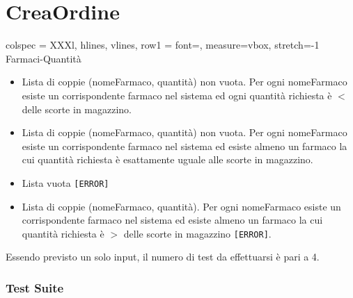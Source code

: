 \section{CreaOrdine}

\begin{table}[!hbp]
	\centering
	\footnotesize
	\begin{tblr}{
		colspec = XXXl,
		hlines, vlines,
		row{1} = {font=\bfseries},
		measure=vbox, stretch=-1
		}
		Farmaci-Quantità \\
		\begin{itemize}[leftmargin=*]
			\item Lista di coppie (nomeFarmaco, quantità) non vuota. Per ogni nomeFarmaco esiste un corrispondente farmaco nel sistema ed ogni quantità richiesta è $<$ delle scorte in magazzino.
			\item Lista di coppie (nomeFarmaco, quantità) non vuota. Per ogni nomeFarmaco esiste un corrispondente farmaco nel sistema ed esiste almeno un farmaco la cui quantità richiesta è esattamente uguale alle scorte in magazzino.
			\item Lista vuota \texttt{[ERROR]}
			\item Lista di coppie (nomeFarmaco, quantità). Per ogni nomeFarmaco esiste un corrispondente farmaco nel sistema ed esiste almeno un farmaco la cui quantità richiesta è $>$ delle scorte in magazzino \texttt{[ERROR]}.
		\end{itemize}
	\end{tblr}
\end{table}

\noindent Essendo previsto un solo input, il numero di test da effettuarsi è pari a 4.

\subsubsection*{Test Suite}

